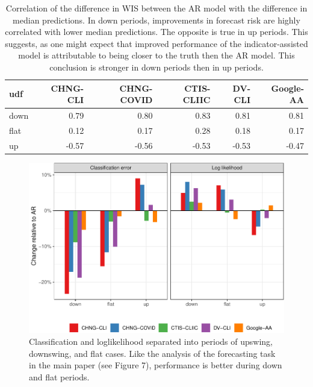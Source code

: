\documentclass[9pt,twoside,lineno]{pnas-new}
\begin{document}
\clearpage

\begin{table}

\caption{\label{tab:upswing-corr-table}Correlation of the difference in WIS between the AR model with the difference in median predictions. In down periods, improvements in forecast risk are highly correlated with lower median predictions. The opposite is true in up periods. This suggests, as one might expect that improved performance of the indicator-assisted model is attributable to being closer to the truth then the AR model. This conclusion is stronger in down periods then in up periods.}
\centering
\begin{tabular}[t]{lrrrrr}
\toprule
udf & CHNG-CLI & CHNG-COVID & CTIS-CLIIC & DV-CLI & Google-AA\\
\midrule
down & 0.79 & 0.80 & 0.83 & 0.81 & 0.81\\
flat & 0.12 & 0.17 & 0.28 & 0.18 & 0.17\\
up & -0.57 & -0.56 & -0.53 & -0.53 & -0.47\\
\bottomrule
\end{tabular}
\end{table}

\clearpage

\begin{figure}

{\centering \includegraphics[width=\textwidth]{fig/hotspots-upswing-downswing-1} 

}

\caption{Classification and loglikelihood separated into periods of upswing, downswing, and flat cases. Like the analysis of the forecasting task in the main paper (see Figure 7), performance is better during down and flat periods.}\label{fig:hotspots-upswing-downswing}
\end{figure}
\end{document}
